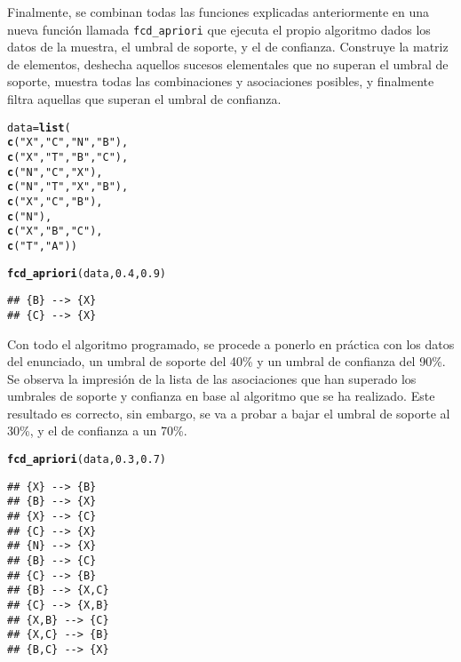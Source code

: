 \documentclass[12pt]{report}\usepackage[]{graphicx}\usepackage[dvipsnames]{xcolor}
\makeatletter
\newcommand{\hlnum}[1]{\textcolor[rgb]{0.686,0.059,0.569}{#1}}%
\newcommand{\hlstr}[1]{\textcolor[rgb]{0.192,0.494,0.8}{#1}}%
\newcommand{\hlstd}[1]{\textcolor[rgb]{0.345,0.345,0.345}{#1}}%
\newcommand{\hlkwb}[1]{\textcolor[rgb]{0.69,0.353,0.396}{#1}}%
\newcommand{\hlkwd}[1]{\textcolor[rgb]{0.737,0.353,0.396}{\textbf{#1}}}%
\newenvironment{kframe}{%
 \def\at@end@of@kframe{}%
 \ifinner\ifhmode%
  \def\at@end@of@kframe{\end{minipage}}%
  \begin{minipage}{\columnwidth}%
 \fi\fi%
 \def\FrameCommand##1{\hskip\@totalleftmargin \hskip-\fboxsep
 \colorbox{shadecolor}{##1}\hskip-\fboxsep
     \hskip-\linewidth \hskip-\@totalleftmargin \hskip\columnwidth}%
 \MakeFramed {\advance\hsize-\width
   \@totalleftmargin\z@ \linewidth\hsize
   \@setminipage}}%
 {\par\unskip\endMakeFramed%
 \at@end@of@kframe}
\newenvironment{knitrout}{}{} %
\makeatother
\begin{document}
			Finalmente, se combinan todas las funciones explicadas anteriormente en una nueva función llamada \texttt{fcd\_apriori} que ejecuta el propio algoritmo dados los datos de la muestra, el umbral de soporte, y el de confianza. Construye la matriz de elementos, deshecha aquellos sucesos elementales que no superan el umbral de soporte, muestra todas las combinaciones y asociaciones posibles, y finalmente filtra aquellas que superan el umbral de confianza.
			
\begin{knitrout}
\color{fgcolor}\begin{kframe}
\begin{alltt}
\hlstd{data} \hlkwb{=} \hlkwd{list}\hlstd{(}
\hlkwd{c}\hlstd{(}\hlstr{"X"}\hlstd{,} \hlstr{"C"}\hlstd{,} \hlstr{"N"}\hlstd{,} \hlstr{"B"}\hlstd{),}
\hlkwd{c}\hlstd{(}\hlstr{"X"}\hlstd{,} \hlstr{"T"}\hlstd{,} \hlstr{"B"}\hlstd{,} \hlstr{"C"}\hlstd{),}
\hlkwd{c}\hlstd{(}\hlstr{"N"}\hlstd{,} \hlstr{"C"}\hlstd{,} \hlstr{"X"}\hlstd{),}
\hlkwd{c}\hlstd{(}\hlstr{"N"}\hlstd{,} \hlstr{"T"}\hlstd{,} \hlstr{"X"}\hlstd{,} \hlstr{"B"}\hlstd{),}
\hlkwd{c}\hlstd{(}\hlstr{"X"}\hlstd{,} \hlstr{"C"}\hlstd{,} \hlstr{"B"}\hlstd{),}
\hlkwd{c}\hlstd{(}\hlstr{"N"}\hlstd{),}
\hlkwd{c}\hlstd{(}\hlstr{"X"}\hlstd{,} \hlstr{"B"}\hlstd{,} \hlstr{"C"}\hlstd{),}
\hlkwd{c}\hlstd{(}\hlstr{"T"}\hlstd{,} \hlstr{"A"}\hlstd{))}

\hlkwd{fcd_apriori}\hlstd{(data,} \hlnum{0.4}\hlstd{,} \hlnum{0.9}\hlstd{)}
\end{alltt}
\begin{verbatim}
## {B} --> {X}
## {C} --> {X}
\end{verbatim}
\end{kframe}
\end{knitrout}
			
			Con todo el algoritmo programado, se procede a ponerlo en práctica con los datos del enunciado, un umbral de soporte del 40\% y un umbral de confianza del 90\%. Se observa la impresión de la lista de las asociaciones que han superado los umbrales de soporte y confianza en base al algoritmo que se ha realizado. Este resultado es correcto, sin embargo, se va a probar a bajar el umbral de soporte al 30\%, y el de confianza a un 70\%. 
			
\begin{knitrout}
\color{fgcolor}\begin{kframe}
\begin{alltt}
\hlkwd{fcd_apriori}\hlstd{(data,} \hlnum{0.3}\hlstd{,} \hlnum{0.7}\hlstd{)}
\end{alltt}
\begin{verbatim}
## {X} --> {B}
## {B} --> {X}
## {X} --> {C}
## {C} --> {X}
## {N} --> {X}
## {B} --> {C}
## {C} --> {B}
## {B} --> {X,C}
## {C} --> {X,B}
## {X,B} --> {C}
## {X,C} --> {B}
## {B,C} --> {X}
\end{verbatim}
\end{kframe}
\end{knitrout}
			
\end{document}
